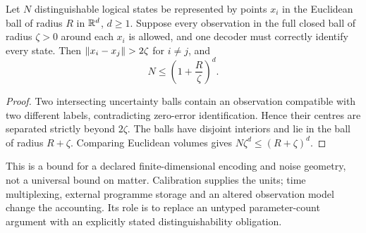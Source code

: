 \begin{proposition}\label{prop:packing}
Let $N$ distinguishable logical states be represented by points $x_i$ in the Euclidean ball of radius $R$ in $\mathbb{R}^d$, $d\geq1$. Suppose every observation in the full closed ball of radius $\zeta>0$ around each $x_i$ is allowed, and one decoder must correctly identify every state. Then $\left\lVert x_i-x_j\right\rVert>2\zeta$ for $i\ne j$, and
\[
 N\leq\left(1+\frac{R}{\zeta}\right)^d.
\]
\end{proposition}
\begin{proof}
Two intersecting uncertainty balls contain an observation compatible with two different labels, contradicting zero-error identification. Hence their centres are separated strictly beyond $2\zeta$. The balls have disjoint interiors and lie in the ball of radius $R+\zeta$. Comparing Euclidean volumes gives $N\zeta^d\leq(R+\zeta)^d$.
\end{proof}
This is a bound for a declared finite-dimensional encoding and noise geometry, not a universal bound on matter. Calibration supplies the units; time multiplexing, external programme storage and an altered observation model change the accounting. Its role is to replace an untyped parameter-count argument with an explicitly stated distinguishability obligation.

